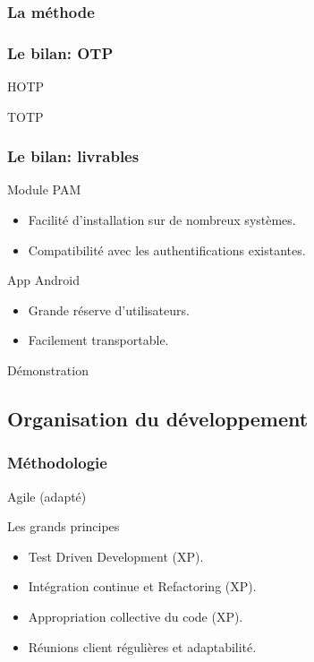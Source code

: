 \documentclass[xcolor=table]{beamer}
\begin{document}
\begin{frame}
\frametitle{La méthode}
\end{frame}

\begin{frame}
\frametitle{Le bilan: OTP}
\begin{block}{HOTP}

\end{block}
\begin{block}{TOTP}

\end{block}
\end{frame}


\begin{frame}
\frametitle{Le bilan: livrables}
\begin{block}{Module PAM}
\begin{itemize}
\item Facilité d'installation sur de nombreux systèmes.
\item Compatibilité avec les authentifications existantes.
\end{itemize}
\end{block}

\begin{block}{App Android}
\begin{itemize}
\item Grande réserve d'utilisateurs.
\item Facilement transportable.
\end{itemize}
\end{block} 
\end{frame}

\begin{frame}
\begin{center}
\Huge{Démonstration}
\end{center}
\end{frame}


\subsection{Organisation du développement}

\begin{frame}
\frametitle{Méthodologie}
\begin{center}
\Huge Agile (adapté)
\normalsize
\begin{block}{Les grands principes}
\begin{itemize}
 \item Test Driven Development (XP).
 \item Intégration continue et Refactoring (XP).
 \item Appropriation collective du code (XP).
 \item Réunions client régulières et adaptabilité.
\end{itemize}
\end{block}
\end{center}

\end{frame}
\end{document}
